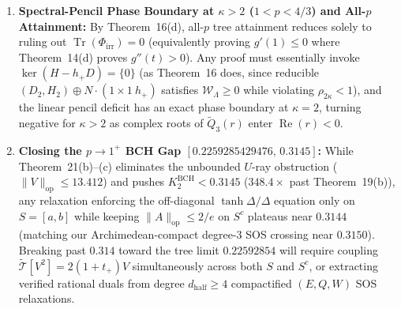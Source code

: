\documentclass[10pt,letterpaper]{article}
\newcommand{\Tr}{\operatorname{Tr}}
\newcommand{\op}{\mathrm{op}}
\begin{document}
\begin{enumerate}[leftmargin=1.6em,itemsep=3pt]
  \item \textbf{Spectral-Pencil Phase Boundary at $\kappa > 2$ ($1 < p < 4/3$) and All-$p$ Attainment:} By Theorem~16(d), all-$p$ tree attainment reduces solely to ruling out $\Tr(\Phi_{\mathrm{irr}}) = 0$ (equivalently proving $g'(1) \le 0$ where Theorem~14(d) proves $g''(t) > 0$). Any proof must essentially invoke $\ker(H - h_+ D) = \{0\}$ (as Theorem~16 does, since reducible $(D_2, H_2) \oplus N\cdot(1\times 1\ h_+)$ satisfies $\mathcal{W}_\Lambda \ge 0$ while violating $\rho_{2\kappa} < 1$), and the linear pencil deficit has an exact phase boundary at $\kappa = 2$, turning negative for $\kappa > 2$ as complex roots of $\widetilde{Q}_3(r)$ enter $\operatorname{Re}(r) < 0$.
  \item \textbf{Closing the $p \to 1^+$ BCH Gap $[0.2259285429476,\, 0.3145]$:} While Theorem~21(b)--(c) eliminates the unbounded $U$-ray obstruction ($\|V\|_{\op} \le 13.412$) and pushes $K_2^{\mathrm{BCH}} < 0.3145$ ($348.4\times$ past Theorem~19(b)), any relaxation enforcing the off-diagonal $\tanh\Delta/\Delta$ equation only on $S = [a, b]$ while keeping $\|A\|_{\op} \le 2/e$ on $S^c$ plateaus near $0.3144$ (matching our Archimedean-compact degree-3 SOS crossing near $0.3150$). Breaking past $0.314$ toward the tree limit $0.22592854$ will require coupling $\widetilde{\mathcal{T}}[V^2] = 2(1+t_+) V$ simultaneously across both $S$ and $S^c$, or extracting verified rational duals from degree $d_{\mathrm{half}} \ge 4$ compactified $(E, Q, W)$ SOS relaxations.
\end{enumerate}
\end{document}
